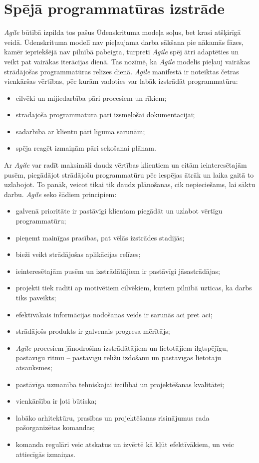 \section{Spējā programmatūras izstrāde}
\textit{Agile} būtībā izpilda tos pašus Ūdenskrituma modeļa soļus, bet krasi atšķirīgā veidā. Ūdenskrituma modelī nav pieļaujama darba sākšana pie nākamās fāzes, kamēr iepriekšējā nav pilnībā pabeigta, turpretī \textit{Agile} spēj ātri adaptēties un veikt pat vairākas iterācijas dienā. Tas nozīmē, ka\textit{ Agile} modelis pieļauj vairākas strādājošas programmatūras relīzes dienā.
\textit{Agile} manifestā ir noteiktas četras vienkāršas vērtības, pēc kurām vadoties var labāk izstrādāt programmatūru:
\begin{itemize}
	\item cilvēki un mijiedarbība pāri procesiem un rīkiem;
	\item strādājoša programmatūra pāri izsmeļošai dokumentācijai;
	\item sadarbība ar klientu pāri līguma sarunām;
	\item spēja reagēt izmaiņām pāri sekošanai plānam.
\end{itemize}
Ar \textit{Agile} var radīt maksimāli daudz vērtības klientiem un citām ieinteresētajām pusēm, piegādājot strādājošu programmatūru pēc iespējas ātrāk un laika gaitā to uzlabojot. To panāk, veicot tikai tik daudz plānošanas, cik nepieciešams, lai sāktu darbu.
\textit{Agile} seko šādiem principiem:
\begin{itemize}
	\item galvenā prioritāte ir pastāvīgi klientam piegādāt un uzlabot vērtīgu programmatūru;
	\item pieņemt mainīgas prasības, pat vēlās izstrādes stadijās;
	\item bieži veikt strādājošas aplikācijas relīzes;
	\item ieinteresētajām pusēm un izstrādātājiem ir pastāvīgi jāsastrādājas;
	\item projekti tiek radīti ap motivētiem cilvēkiem, kuriem pilnībā uzticas, ka darbs tiks paveikts;
	\item efektīvākais informācijas nodošanas veids ir sarunās aci pret aci;
	\item strādājošs produkts ir galvenais progresa mērītājs;
	\item \textit{Agile} procesiem jānodrošina izstrādātājiem un lietotājiem ilgtspējīgu, pastāvīgu ritmu -- pastāvīgu relīžu izdošanu un pastāvīgas lietotāju atsauksmes;
	\item pastāvīga uzmanība tehniskajai izcilībai un projektēšanas kvalitātei;
	\item vienkāršība ir ļoti būtiska;
	\item labāko arhitektūru, prasības un projektēšanas risinājumus rada pašorganizētas komandas;
	\item komanda regulāri veic atskatus un izvērtē kā kļūt efektīvākiem, un veic attiecīgās izmaiņas.
\end{itemize}
